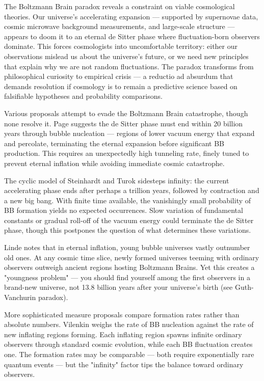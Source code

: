 The Boltzmann Brain paradox reveals a constraint on viable cosmological theories. Our universe's accelerating expansion — supported by supernovae data, cosmic microwave background measurements, and large-scale structure — appears to doom it to an eternal de Sitter phase where fluctuation-born observers dominate. This forces cosmologists into uncomfortable territory: either our observations mislead us about the universe's future, or we need new principles that explain why we are not random fluctuations. The paradox transforms from philosophical curiosity to empirical crisis — a reductio ad absurdum that demands resolution if cosmology is to remain a predictive science based on falsifiable hypotheses and probability comparisons.

Various proposals attempt to evade the Boltzmann Brain catastrophe, though none resolve it. Page suggests the de Sitter phase must end within 20 billion years through bubble nucleation — regions of lower vacuum energy that expand and percolate, terminating the eternal expansion before significant BB production. This requires an unexpectedly high tunneling rate, finely tuned to prevent eternal inflation while avoiding immediate cosmic catastrophe.

The cyclic model of Steinhardt and Turok sidesteps infinity: the current accelerating phase ends after perhaps a trillion years, followed by contraction and a new big bang. With finite time available, the vanishingly small probability of BB formation yields no expected occurrences. Slow variation of fundamental constants or gradual roll-off of the vacuum energy could terminate the de Sitter phase, though this postpones the question of what determines these variations.

Linde notes that in eternal inflation, young bubble universes vastly outnumber old ones. At any cosmic time slice, newly formed universes teeming with ordinary observers outweigh ancient regions hosting Boltzmann Brains. Yet this creates a "youngness problem" — you should find yourself among the first observers in a brand-new universe, not 13.8 billion years after your universe's birth (see Guth-Vanchurin paradox).

More sophisticated measure proposals compare formation rates rather than absolute numbers. Vilenkin weighs the rate of BB nucleation against the rate of new inflating regions forming. Each inflating region spawns infinite ordinary observers through standard cosmic evolution, while each BB fluctuation creates one. The formation rates may be comparable — both require exponentially rare quantum events — but the "infinity" factor tips the balance toward ordinary observers.

